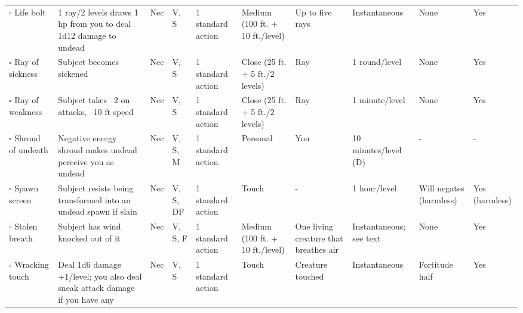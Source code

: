 \documentclass[12pt, a4paper]{article}
\begin{document}
\begin{center}
\begin{longtable}[H]{ p{8em} p{15em} p{2em} p{5em} p{6em} p{6em} p{10em} p{6em} p{5em} p{2em} }
    \(\square\) Life bolt & 1 ray/2 levels draws 1 hp from you to deal 1d12 damage to undead & Nec & V, S & 1 standard action & Medium (100 ft. + 10 ft./level) & Up to ﬁve rays & Instantaneous & None & Yes\\
    \(\square\) Ray of sickness & Subject becomes sickened & Nec & V, S & 1 standard action & Close (25 ft. + 5 ft./2 levels) & Ray & 1 round/level & None & Yes\\
    \(\square\) Ray of weakness & Subject takes –2 on attacks, –10 ft speed & Nec & V, S & 1 standard action & Close (25 ft. + 5 ft./2 levels) & Ray & 1 minute/level & None & Yes\\
    \(\square\) Shroud of undeath & Negative energy shroud makes undead perceive you as undead & Nec & V, S, M & 1 standard action & Personal & You & 10 minutes/level (D) & - & -\\
    \(\square\) Spawn screen & Subject resists being transformed into an undead spawn if slain & Nec & V, S, DF & 1 standard action & Touch & - & 1 hour/level & Will negates (harmless) & Yes (harmless)\\
    \(\square\) Stolen breath & Subject has wind knocked out of it & Nec & V, S, F & 1 standard action & Medium (100 ft. + 10 ft./level) & One living creature that breathes air & Instantaneous; see text & None & Yes\\
    \(\square\) Wracking touch & Deal 1d6 damage +1/level; you also deal sneak attack damage if you have any & Nec & V, S & 1 standard action & Touch & Creature touched & Instantaneous & Fortitude half & Yes\\
  \end{longtable}


\end{center}
\end{document}
